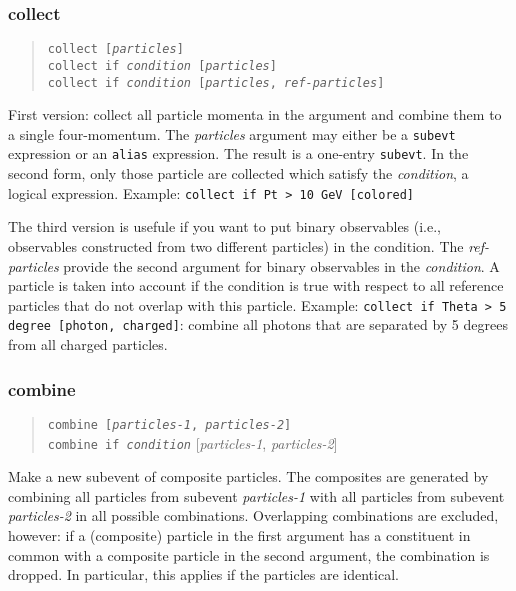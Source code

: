 \documentclass[12pt]{book}
\newcommand{\ttt}[1]{\texttt{#1}}
\begin{document}
\subsubsection{collect}
\begin{quote}
\begin{footnotesize}
  \ttt{collect [\textit{particles}]} \\
  \ttt{collect if \textit{condition} [\textit{particles}]} \\   
  \ttt{collect if \textit{condition} [\textit{particles}, \textit{ref-particles}]}
\end{footnotesize}
\end{quote}
First version: collect all particle momenta in the argument and combine them
to a single four-momentum.  The \textit{particles} argument may either be a
\ttt{subevt} expression or an \ttt{alias} expression.  The result is a
one-entry \ttt{subevt}.  In the second form, only those particle are collected
which satisfy the \textit{condition}, a logical expression.  Example:
\ttt{collect if Pt > 10 GeV [colored]}

The third version is usefule if you want to put binary observables (i.e.,
observables constructed from two different particles) in the condition.  The
\textit{ref-particles} provide the second argument for binary observables in
the \textit{condition}.  A particle is taken into account if the condition is
true with respect to all reference particles that do not overlap with this
particle.  Example: \ttt{collect if Theta > 5 degree [photon, charged]}:
combine all photons that are separated by 5 degrees from all charged
particles.


\subsubsection{combine}
\begin{quote}
\begin{footnotesize}
  \ttt{combine [\textit{particles-1}, \textit{particles-2}]} \\
  \ttt{combine if \textit{condition}} [\textit{particles-1}, \textit{particles-2}]
\end{footnotesize}
\end{quote}
Make a new subevent of composite particles.  The composites are generated by
combining all particles from subevent \textit{particles-1} with all particles
from subevent \textit{particles-2} in all possible combinations.  Overlapping
combinations are excluded, however: if a (composite) particle in the first
argument has a constituent in common with a composite particle in the second
argument, the combination is dropped.  In particular, this applies if the
particles are identical.
\end{document}
